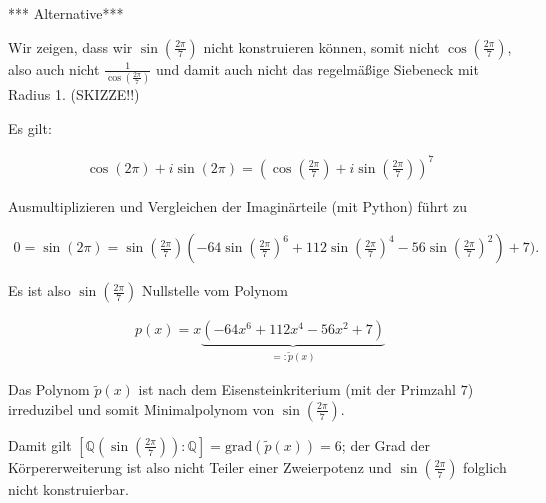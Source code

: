 \begin{solution}
  *** Alternative***

  Wir zeigen, dass wir $\sin(\frac{2 \pi }{7})$ nicht konstruieren können, somit nicht $\cos(\frac{2 \pi }{7})$, also auch nicht $\frac{1}{\cos(\frac{2 \pi }{7})}$ und damit auch nicht das regelmäßige Siebeneck mit Radius 1. (SKIZZE!!)

  Es gilt:

  \begin{align*}
    \cos(2 \pi) + i \sin(2 \pi) = (\cos(\frac{2 \pi }{7}) + i \sin(\frac{2 \pi }{7}))^{7}
  \end{align*}

  Ausmultiplizieren und Vergleichen der Imaginärteile (mit Python) führt zu

  \begin{align*}
    0 = \sin(2 \pi) = \sin(\frac{2 \pi }{7}) (-64 \sin(\frac{2 \pi }{7})^{6} + 112 \sin(\frac{2 \pi }{7})^4 - 56 \sin(\frac{2 \pi }{7})^2) + 7).
  \end{align*}

  Es ist also $\sin(\frac{2 \pi }{7})$ Nullstelle vom Polynom

  \begin{align*}
    p(x) = x\underbrace{(-64x^6 + 112x^4 - 56x^2 + 7)}_{=:\tilde{p}(x)}
  \end{align*}

  Das Polynom $\tilde{p}(x)$ ist nach dem Eisensteinkriterium (mit der Primzahl $7$) irreduzibel und somit Minimalpolynom von $\sin(\frac{2 \pi }{7})$.

  Damit gilt $[\mathbb{Q}(\sin(\frac{2 \pi }{7})):\mathbb{Q}] = \mathrm{grad}(\tilde{p}(x)) = 6$; der Grad der Körpererweiterung ist also nicht Teiler einer Zweierpotenz und $\sin(\frac{2 \pi }{7})$ folglich nicht konstruierbar.

\end{solution}
